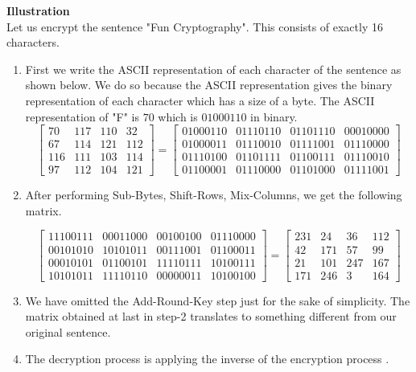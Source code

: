 \documentclass[11pt]{amsart}
\theoremstyle{plain}
\theoremstyle{definition}
\numberwithin{equation}{section}
\begin{document}
\textbf{Illustration}\\
Let us encrypt the sentence "Fun Cryptography". This consists of exactly 16 characters.
\begin{enumerate}
\item First we write the ASCII representation of each character of the sentence as shown below. We do so because the ASCII representation gives the binary representation of each character which has a size of a byte. The ASCII representation of "F" is \(70\) which is \(01000110\) in binary.
  \[\begin{bmatrix}
      70 & 117 & 110 & 32 \\
      67 & 114 & 121 & 112\\
      116 & 111 & 103 & 114 \\
      97 & 112 & 104 & 121
    \end{bmatrix}=
    \begin{bmatrix}
      01000110 & 01110110 & 01101110 & 00010000 \\
      01000011 & 01110010 & 01111001 & 01110000\\
      01110100 & 01101111 & 01100111 & 01110010 \\
      01100001 & 01110000 & 01101000 & 01111001
    \end{bmatrix}
  \]


\item After performing Sub-Bytes, Shift-Rows, Mix-Columns, we get the following matrix.

  \[\begin{bmatrix}
      11100111 & 00011000 & 00100100 & 01110000\\
      00101010 & 10101011 & 00111001 & 01100011\\
      00010101 & 01100101 & 11110111 & 10100111\\
      10101011 & 11110110 & 00000011 & 10100100
    \end{bmatrix}=
    \begin{bmatrix}
      231 & 24 & 36 & 112\\
      42 & 171 & 57 & 99\\
      21 & 101 & 247 & 167\\
      171 & 246 & 3 & 164
    \end{bmatrix}
  \]

\item We have omitted the Add-Round-Key step just for the sake of simplicity. The matrix obtained at last in step-2 translates to something different from our original sentence.

\item The decryption process is applying the inverse of the encryption process \cite{aes}.
\end{enumerate}
\clearpage
\end{document}
